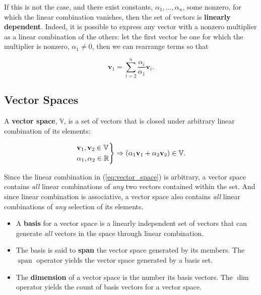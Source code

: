 \documentclass[12pt, twoside, draft]{article}
\begin{document}
If this is not the case, and there exist constants, $\alpha_1, \ldots, \alpha_n$, some nonzero, for which the linear combination vanishes, then the set of vectors is \textbf{linearly dependent}.  Indeed, it is possible to express any vector with a nonzero multiplier as a linear combination of the others:  let the first vector be one for which the multiplier is nonzero, $\alpha_1 \neq 0$, then we can rearrange terms so that

\begin{equation}\label{eq:linear_dependence}
\mathbf{v}_1 = \sum_{i=2}^n \frac{\alpha_i}{\alpha_1} \mathbf{v}_i .
\end{equation}

\subsection{Vector Spaces}\label{sec:vector-spaces}

A \textbf{vector space}, $\mathbb{V}$, is a set of vectors that is closed under arbitrary linear combination of its elements:

\begin{equation}\label{eq:vector_space}
\begin{rcases}
\mathbf{v}_1, \mathbf{v}_2 \in \mathbb{V} \\
\alpha_1, \alpha_2 \in \mathbb{R}
\end{rcases}
\Rightarrow
\left( \alpha_1 \mathbf{v}_1 + \alpha_2 \mathbf{v}_2 \right) \in \mathbb{V} .
\end{equation}

Since the linear combination in (\ref{eq:vector_space}) is arbitrary, a vector space contains \textit{all} linear combinations of \textit{any} two vectors contained within the set.  And since linear combination is associative, a vector space also contains \textit{all} linear combinations of \textit{any} selection of its elements.  

\begin{itemize}[noitemsep]
\item A \textbf{basis} for a vector space is a linearly independent set of vectors that can generate \textit{all} vectors in the space through linear combination.
\item The basis is said to \textbf{span} the vector space generated by its members.  The $\operatorname{span}$ operator yields the vector space generated by a basis set.
\item The \textbf{dimension} of a vector space is the number its basis vectors.  The $\dim$ operator yields the count of basis vectors for a vector space.
\end{itemize}
\end{document}
